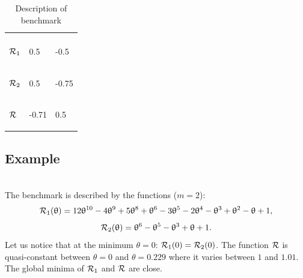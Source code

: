 \documentclass[article,authoryear,jmlmc]{beg_32}             %
\begin{document}
\begin{table}[h!]
	\centering
	\caption{Description of benchmark \exTwo}
	\begin{tabular}{lll}
		
		\begin{bf} \diagbox{Functions}{Minima} \end{bf} & \begin{bf}\mg\end{bf} & \begin{bf}\ml\end{bf} \\
		
		
		\begin{bf}$\mathcal{R}_1$\end{bf} & 0.5 & -0.5  \\ 
		\begin{bf}$\mathcal{R}_2$\end{bf} & 0.5 & -0.75 \\ 
		\begin{bf}$\mathcal{R}$\end{bf}   & -0.71 & 0.5 \\ 
	\end{tabular}
	\label{ex2_example}
\end{table}

\subsection{Example \exThree}
~~\\
The benchmark is described by the functions ($m=2$):
\begin{equation*}
	\mathcal{R}_1(\uptheta) = 12\uptheta^{10}-4\uptheta^9+5\uptheta^8+\uptheta^6-3\uptheta^5-2\uptheta^4-\uptheta^3+\uptheta^2-\uptheta+1,
\end{equation*}
\begin{equation*}
	\mathcal{R}_2(\uptheta) = \uptheta^6-\uptheta^5-\uptheta^3+\uptheta+1.
\end{equation*}
Let us notice that at the minimum $\theta=0$: $\mathcal{R}_1(0)=\mathcal{R}_2(0)$. The function $\mathcal{R}$ is quasi-constant between $\theta=0$ and $\theta=0.229$ where it varies between $1$ and $1.01$. The global minima of $\mathcal{R}_1$ and $\mathcal{R}$ are close.
\end{document}

